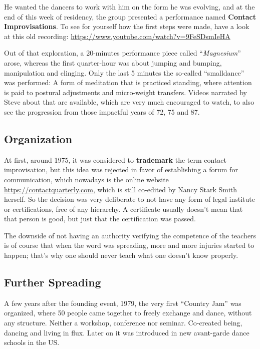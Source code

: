 He wanted the dancers to work with him on the form he was evolving, and at the end of this week of residency, the group presented a performance named \textbf{Contact Improvisations}.
To see for yourself how the first steps were made, have a look at this old recording: \url{https://www.youtube.com/watch?v=9FeSDsmIeHA}

Out of that exploration, a 20-minutes performance piece called ``\textit{Magnesium}'' arose, whereas the first quarter-hour was about jumping and bumping, manipulation and clinging.
Only the last 5 minutes the so-called ``\gls{smalldance}'' was performed: A form of meditation that is practiced standing, where attention is paid to postural adjustments and micro-weight transfers.
Videos narrated by Steve about that are available, which are very much encouraged to watch, to also see the progression from those impactful years of 72, 75 and 87.

\subsection{Organization}\label{subsec:organization}

At first, around 1975, it was considered to \textbf{trademark} the term contact improvisation, but this idea was rejected in favor of establishing a forum for communication, which nowadays is the online website \url{https://contactquarterly.com}, which is still co-edited by Nancy Stark Smith herself.
So the decision was very deliberate to not have any form of legal institute or certifications, free of any hierarchy.
A certificate usually doesn't mean that that person is good, but just that the certification was passed.

The downside of not having an authority verifying the competence of the teachers is of course that when the word was spreading, more and more injuries started to happen;
that's why one should never teach what one doesn't know properly.

\subsection{Further Spreading}\label{subsec:further-spreading}

A few years after the founding event, 1979, the very first ``Country Jam'' was organized, where 50 people came together to freely exchange and dance, without any structure.
Neither a workshop, conference nor seminar.
Co-created being, dancing and living in flux.
Later on it was introduced in new avant-garde dance schools in the US.

